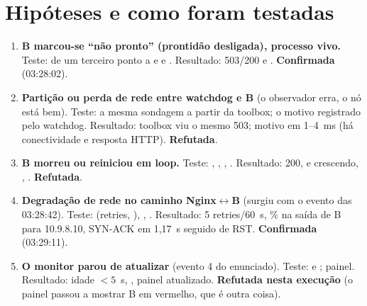 \documentclass[10pt,a4paper]{article}
\begin{document}
\section{Hipóteses e como foram testadas}
\begin{enumerate}[leftmargin=*]
  \item \textbf{B marcou-se ``não pronto'' (prontidão desligada), processo vivo.} Teste:  de um terceiro ponto a  e  e . Resultado: 503/200 e . \textbf{Confirmada} (03:28:02).
  \item \textbf{Partição ou perda de rede entre watchdog e B} (o observador erra, o nó está bem). Teste: a mesma sondagem a partir da toolbox; o motivo registrado pelo watchdog. Resultado: toolbox viu o mesmo 503; motivo  em 1--4~ms (há conectividade e resposta HTTP). \textbf{Refutada}.
  \item \textbf{B morreu ou reiniciou em loop.} Teste: , , , . Resultado:  200,  e crescendo, , . \textbf{Refutada}.
  \item \textbf{Degradação de rede no caminho Nginx$\leftrightarrow$B} (surgiu com o evento das 03:28:42). Teste:  (retries, ), , . Resultado: 5 retries/60~s, \% na saída de B para 10.9.8.10, SYN-ACK em 1,17~s seguido de RST. \textbf{Confirmada} (03:29:11).
  \item \textbf{O monitor parou de atualizar} (evento 4 do enunciado). Teste:  e ; painel. Resultado: idade $<5$~s, , painel atualizado. \textbf{Refutada nesta execução} (o painel passou a mostrar B em vermelho, que é outra coisa).
\end{enumerate}
\end{document}
